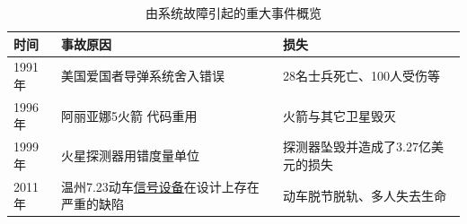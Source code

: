 \documentclass[9pt, CJK]{beamer}
\begin{document}
\begin{frame}
			\begin{table}[htbp]
				\setlength{\abovecaptionskip}{-0.2cm}  %
				\setlength{\belowcaptionskip}{-0.4cm} %
				\fontsize{7pt}{\baselineskip}\selectfont
				\caption{由系统故障引起的重大事件概览}
				\label{tab:systemEvents_1.1}
				\centering
				\begin{tabular}{p{}p{}p{}}%
					\toprule
					\textbf{时间}&\textbf{事故原因}&\textbf{损失}\\
					\midrule
					1991年 & 美国爱国者导弹系统舍入错误 & 28名士兵死亡、100人受伤等\\
					1996年 & 阿丽亚娜5火箭 代码重用 & 火箭与其它卫星毁灭\\
					1999年 & 火星探测器用错度量单位 & 探测器坠毁并造成了3.27亿美元的损失\\
					2011年 & 温州7.23动车\underline{信号设备}在设计上存在严重的缺陷 &动车脱节脱轨、多人失去生命\\
					\bottomrule
				\end{tabular}
			\end{table}
	\end{frame}
\end{document}
